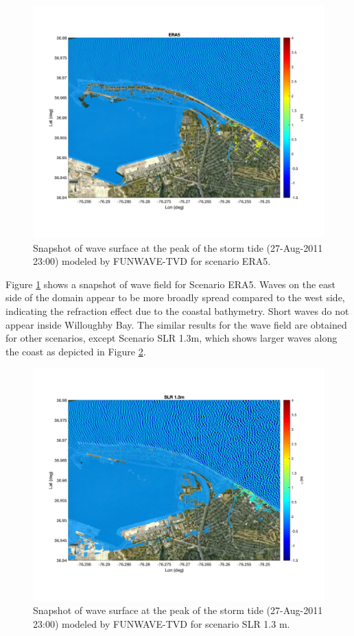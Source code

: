 \documentclass[11pt]{article}
\begin{document}
\begin{figure}[h!]
\centering
\includegraphics[width=\textwidth]{./figures/funwave_ERA5_eta.jpg}
\caption{Snapshot of wave surface at the peak of the storm tide (27-Aug-2011 23:00) modeled by FUNWAVE-TVD for scenario ERA5. }
\label{funwave_ERA5_eta}
\centering
\end{figure}

Figure \ref{funwave_ERA5_eta} shows a snapshot of wave field for Scenario ERA5. Waves on the east side of the domain appear to be more broadly spread compared to the west side, indicating the refraction effect due to the coastal bathymetry. Short waves do not appear inside Willoughby Bay.  The similar results for the wave field are obtained for other scenarios, except Scenario SLR 1.3m, which shows larger waves along the coast as depicted in Figure \ref{funwave_SLR_eta}. 

\begin{figure}[h!]
\centering
\includegraphics[width=\textwidth]{./figures/funwave_SLR _eta.jpg}
\caption{Snapshot of wave surface at the peak of the storm tide (27-Aug-2011 23:00) modeled by FUNWAVE-TVD for scenario SLR 1.3 m. }
\label{funwave_SLR_eta}
\centering
\end{figure}
\end{document}
